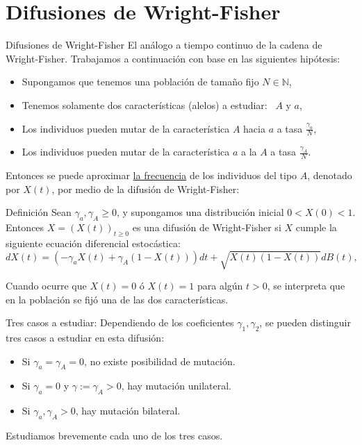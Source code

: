 \documentclass{beamer}
\newcommand{\N}{\mathbb N}
\renewcommand{\1}{\mathds{1}}
\theoremstyle{definition}
\theoremstyle{definition}
\theoremstyle{definition}
\theoremstyle{definition}
\theoremstyle{definition}
\begin{document}
\section{Difusiones de Wright-Fisher}
\begin{frame}{Difusiones de Wright-Fisher}
    El análogo a tiempo continuo de la cadena de Wright-Fisher. 
    Trabajamos a continuación con base en las siguientes hipótesis:
    \newline
    
    \begin{itemize}
        \item Supongamos que tenemos una población de tamaño fijo $N\in \N$,
        \item Tenemos solamente dos características (alelos) a estudiar: \ $A$ y $a$,
        \item Los individuos pueden mutar de la característica $A$ hacia $a$ a tasa $\tfrac{\gamma_a}{N}$,
        \item Los individuos pueden mutar de la característica $a$ a la $A$ a tasa $\tfrac{\gamma_A}{N}$.
    \end{itemize}
\end{frame}
\begin{frame}
    Entonces se puede aproximar \underline{la frecuencia} de los individuos del tipo $A$, denotado por $X(t)$, 
    por medio de la difusión de Wright-Fisher:
    \newline

    \begin{block}{Definición}
        Sean $\gamma_a,\gamma_A\geq0$, y supongamos una distribución inicial $0<X(0)<1$.
        Entonces $X=(X(t))_{t\geq0}$ es una difusión de Wright-Fisher si $X$ cumple la siguiente 
        ecuación diferencial estocástica:
        \[
            dX(t)=(-\gamma_aX(t)+\gamma_A(1-X(t)))dt+\sqrt{X(t)(1-X(t))}dB(t), 
        \]

    \end{block}

    Cuando ocurre que $X(t)=0$ ó $X(t)=1$ para algún $t>0$, se interpreta que en la población se fijó 
    una de las dos características.
\end{frame}
\begin{frame}{Tres casos a estudiar:}
    Dependiendo de los coeficientes $\gamma_1,\gamma_2$, se pueden distinguir tres casos a estudiar 
    en esta difusión:
    \newline

    \begin{itemize}
        \item Si $\gamma_a=\gamma_A=0$, no existe posibilidad de mutación. 
        \item Si $\gamma_a=0$ y $\gamma:=\gamma_A>0$, hay mutación unilateral.
        \item Si $\gamma_a,\gamma_A>0$, hay mutación bilateral.
        \newline

    \end{itemize}
    Estudiamos brevemente cada uno de los tres casos.
\end{frame}
\end{document}
